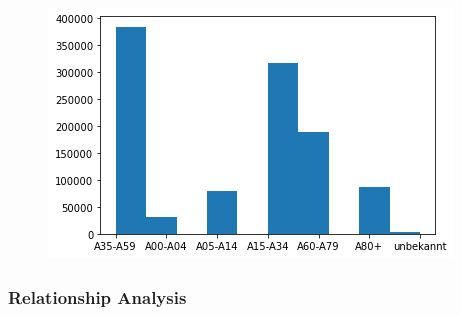 \begin{figure}[H]
	\centering
	\includegraphics[scale = 0.8]{attachment/chapter_3/Scc083}
\end{figure} 
\subsubsection{Relationship Analysis}
